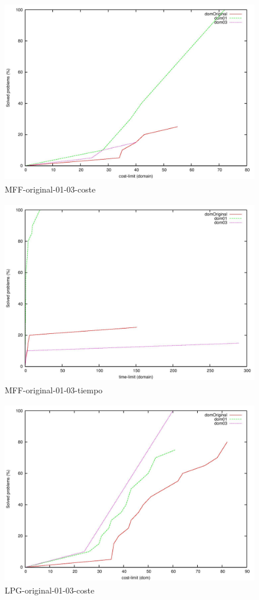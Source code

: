 \documentclass{article}
\begin{document}
    \begin{figure}[H]
        \centering
        \includegraphics[width=12cm, height=8cm]{mff-or-01-03-cost}
        \caption{MFF-original-01-03-coste}
    \end{figure}
    
    \begin{figure}[H]
        \centering
        \includegraphics[width=12cm, height=8cm]{mff-or-01-03-time}
        \caption{MFF-original-01-03-tiempo}
    \end{figure}
    
    \begin{figure}[H]
        \centering
        \includegraphics[width=12cm, height=8cm]{lpg-or-01-03-cost}
        \caption{LPG-original-01-03-coste}
    \end{figure}
    
\end{document}

